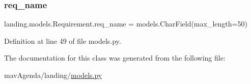 \subsubsection{\texorpdfstring{req\+\_\+name}{req\_name}}
{\footnotesize\ttfamily landing.\+models.\+Requirement.\+req\+\_\+name = models.\+Char\+Field(max\+\_\+length=50)\hspace{0.3cm}{\ttfamily [static]}}



Definition at line 49 of file models.\+py.



The documentation for this class was generated from the following file\+:\begin{DoxyCompactItemize}
\item 
mav\+Agenda/landing/\mbox{\hyperlink{models_8py}{models.\+py}}\end{DoxyCompactItemize}
